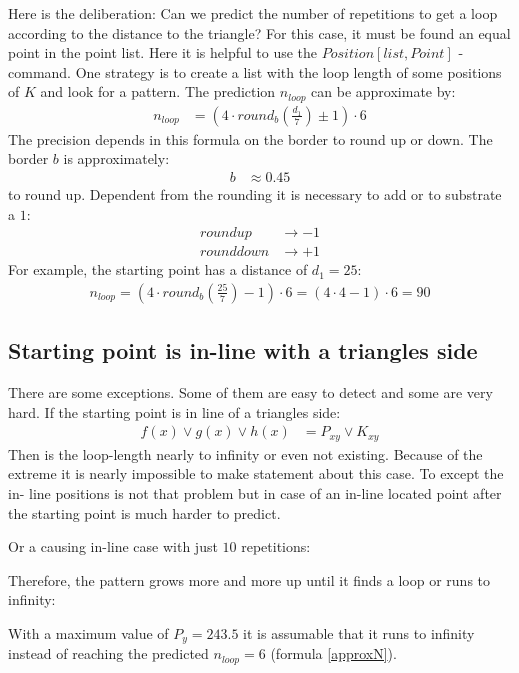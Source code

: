 \documentclass[11pt,a4paper]{article}
\begin{document}
Here is the deliberation: Can we predict the number of repetitions to get a loop according to the distance to the triangle? For this case, it must be found an equal point in the point list. Here it is helpful to use the \(Position[list, {Point}]\) -command. One strategy is to create a list with the loop length of some positions of \(K\) and look for a pattern. The prediction \(n_{loop}\) can be approximate by:
\begin{align}
\label{approxN}n_{loop}&= \left(4 \cdot round_b \left( \frac{d_1}{7} \right) \pm 1\right) \cdot 6
\end{align}
The precision depends in this formula on the border to round up or down. The border \(b\) is approximately:
\begin{align}
b&\approx 0.45
\end{align} 
to round up. Dependent from the rounding it is necessary to add or to substrate a \(1\):
\begin{align}
round up &\rightarrow -1\\
round down &\rightarrow +1 
\end{align}
For example, the starting point has a distance of \(d_1=25\):
\begin{align}
n_{loop}= \left(4 \cdot round_b \left( \frac{25}{7} \right) -1 \right) \cdot 6 = \left(4 \cdot 4 -1 \right) \cdot 6 = 90
\end{align}


\subsection{Starting point is in-line with a triangles side}
There are some exceptions. Some of them are easy to detect and some are very hard. If the starting point is in line of a triangles side:
\begin{align}
f(x) \lor g(x) \lor h(x) &= P_{xy} \lor K_{xy}
\end{align}
Then is the loop-length nearly to infinity or even not existing. Because of the extreme it is nearly impossible to make statement about this case. To except the in- line positions is not that problem but in case of an in-line located point after the starting point is much harder to predict.\\
\pagebreak

Or a causing in-line case with just \(10\) repetitions:

Therefore, the pattern grows more and more up until it finds a loop or runs to infinity:

With a maximum value of \(P_y=243.5\) it is assumable that it runs to infinity instead of reaching the predicted \(n_{loop}=6\) (formula \ref{approxN}).
\pagebreak
\end{document}
